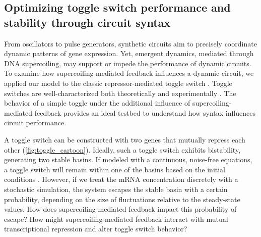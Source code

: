 \documentclass[11pt]{article}
\begin{document}
\FloatBarrier
\subsection{Optimizing toggle switch performance and stability through circuit syntax}
From oscillators to pulse generators, synthetic circuits aim to precisely coordinate dynamic patterns of gene expression. Yet, emergent dynamics, mediated through DNA supercoiling, may support or impede the performance of dynamic circuits. To examine how supercoiling-mediated feedback influences a dynamic circuit, we applied our model to the classic repressor-mediated toggle switch \parencite{gardnerConstructionGeneticToggle2000}. Toggle switches are well-characterized both theoretically \parencite{gardnerConstructionGeneticToggle2000} and experimentally \parencite{gardnerConstructionGeneticToggle2000,yeungBiophysicalConstraintsArising2017,zhuSyntheticMultistabilityMammalian2021}. The behavior of a simple toggle under the additional influence of supercoiling-mediated feedback provides an ideal testbed to understand how syntax influences circuit performance.

A toggle switch can be constructed with two genes that mutually repress each other (\cref{fig:toggle_cartoon}). Ideally, such a toggle switch exhibits bistability, generating two stable basins. If modeled with a continuous, noise-free equations, a toggle switch will remain within one of the basins based on the initial conditions \parencite{gardnerConstructionGeneticToggle2000}. However, if we treat the mRNA concentration discretely with a stochastic simulation, the system escapes the stable basin with a certain probability, depending on the size of fluctuations relative to the steady-state values. How does supercoiling-mediated feedback impact this probability of escape? How might supercoiling-mediated feedback interact with mutual transcriptional repression and alter toggle switch behavior?
\end{document}
